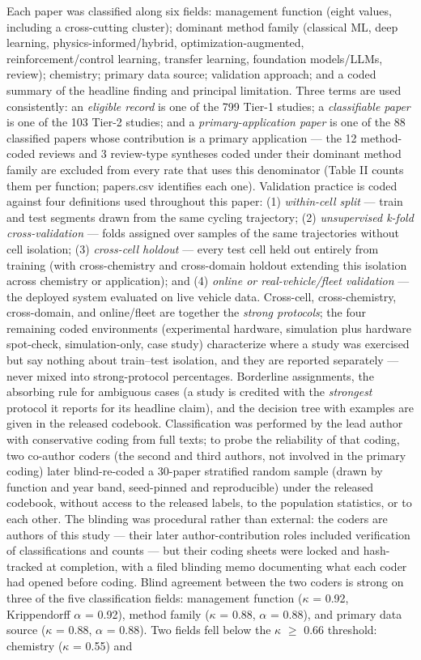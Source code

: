 \documentclass[journal]{IEEEtran}
\begin{document}
Each paper was classified along six fields: management function (eight values, including a cross-cutting cluster); dominant method family (classical ML, deep learning, physics-informed/hybrid, optimization-augmented, reinforcement/control learning, transfer learning, foundation models/LLMs, review); chemistry; primary data source; validation approach; and a coded summary of the headline finding and principal limitation. Three terms are used consistently: an \textit{eligible record} is one of the 799 Tier-1 studies; a \textit{classifiable paper} is one of the 103 Tier-2 studies; and a \textit{primary-application paper} is one of the 88 classified papers whose contribution is a primary application --- the 12 method-coded reviews and 3 review-type syntheses coded under their dominant method family are excluded from every rate that uses this denominator (Table II counts them per function; papers.csv identifies each one). Validation practice is coded against four definitions used throughout this paper: (1) \textit{within-cell split} --- train and test segments drawn from the same cycling trajectory; (2) \textit{unsupervised k-fold cross-validation} --- folds assigned over samples of the same trajectories without cell isolation; (3) \textit{cross-cell holdout} --- every test cell held out entirely from training (with cross-chemistry and cross-domain holdout extending this isolation across chemistry or application); and (4) \textit{online or real-vehicle/fleet validation} --- the deployed system evaluated on live vehicle data. Cross-cell, cross-chemistry, cross-domain, and online/fleet are together the \textit{strong protocols}; the four remaining coded environments (experimental hardware, simulation plus hardware spot-check, simulation-only, case study) characterize where a study was exercised but say nothing about train--test isolation, and they are reported separately --- never mixed into strong-protocol percentages. Borderline assignments, the absorbing rule for ambiguous cases (a study is credited with the \textit{strongest} protocol it reports for its headline claim), and the decision tree with examples are given in the released codebook. Classification was performed by the lead author with conservative coding from full texts; to probe the reliability of that coding, two co-author coders (the second and third authors, not involved in the primary coding) later blind-re-coded a 30-paper stratified random sample (drawn by function and year band, seed-pinned and reproducible) under the released codebook, without access to the released labels, to the population statistics, or to each other. The blinding was procedural rather than external: the coders are authors of this study --- their later author-contribution roles included verification of classifications and counts --- but their coding sheets were locked and hash-tracked at completion, with a filed blinding memo documenting what each coder had opened before coding. Blind agreement between the two coders is strong on three of the five classification fields: management function ($\kappa$ = 0.92, Krippendorff $\alpha$ = 0.92), method family ($\kappa$ = 0.88, $\alpha$ = 0.88), and primary data source ($\kappa$ = 0.88, $\alpha$ = 0.88). Two fields fell below the $\kappa$ $\ge$ 0.66 threshold: chemistry ($\kappa$ = 0.55) and 
\end{document}
